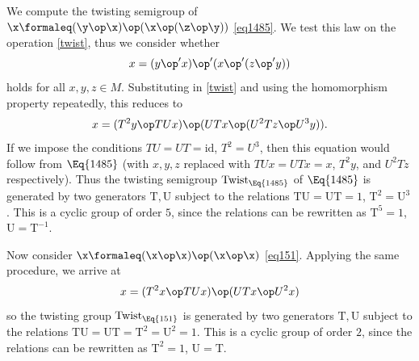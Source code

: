 \begin{example}  We compute the twisting semigroup of $\x \formaleq (\y \op \x) \op (\x \op (\z \op \y))$ \eqref{eq1485}.  We test this law on the operation \eqref{twist}, thus we consider whether
$$x = (y \op' x) \op' (x \op' (z \op' y))$$
holds for all $x,y,z \in M$.  Substituting in \eqref{twist} and using the homomorphism property repeatedly, this reduces to
$$x = (T^2y \op TUx) \op (UTx \op (U^2T z \op U^3y)).$$
If we impose the conditions $TU=UT=\mathrm{id}$, $T^2 = U^3$, then this equation would follow from $\Eq{1485}$ (with $x,y,z$ replaced with $TUx=UTx=x$, $T^2 y$, and $U^2 Tz$ respectively).  Thus the twisting semigroup $\operatorname{Twist}_{\Eq{1485}}$ of $\Eq{1485}$ is generated by two generators $\mathrm{T}, \mathrm{U}$ subject to the relations $\mathrm{T} \mathrm{U}=\mathrm{U} \mathrm{T} = 1$, $\mathrm{T}^2 = \mathrm{U}^3$.  This is a cyclic group of order $5$, since the relations can be rewritten as $\mathrm{T}^5 = 1$, $\mathrm{U} = \mathrm{T}^{-1}$.

Now consider $\x \formaleq (\x \op \x) \op (\x \op \x)$ \eqref{eq151}.  Applying the same procedure, we arrive at
$$x = (T^2 x \op TUx) \op (UT x \op U^2 x)$$
so the twisting group $\operatorname{Twist}_{\Eq{151}}$ is generated by two generators $\mathrm{T}, \mathrm{U}$ subject to the relations $\mathrm{T} \mathrm{U}=\mathrm{U} \mathrm{T} = \mathrm{T}^2 = \mathrm{U}^2 = 1$.  This is a cyclic group of order $2$, since the relations can be rewritten as $\mathrm{T}^2 = 1$, $\mathrm{U} = \mathrm{T}$.
\end{example}

